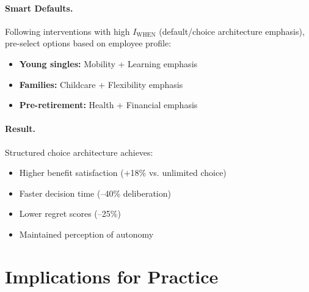 \paragraph{Smart Defaults.}

Following interventions with high $I_{\text{WHEN}}$ (default/choice architecture emphasis), pre-select options based on employee profile:

\begin{itemize}[nosep]
    \item \textbf{Young singles:} Mobility + Learning emphasis
    \item \textbf{Families:} Childcare + Flexibility emphasis
    \item \textbf{Pre-retirement:} Health + Financial emphasis
\end{itemize}

\paragraph{Result.} Structured choice architecture achieves:
\begin{itemize}[nosep]
    \item Higher benefit satisfaction (+18\% vs. unlimited choice)
    \item Faster decision time (--40\% deliberation)
    \item Lower regret scores (--25\%)
    \item Maintained perception of autonomy
\end{itemize}


\section{Implications for Practice}
\label{sec:hhh-practice}

